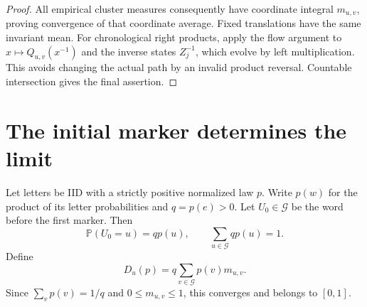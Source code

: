 \documentclass[11pt]{article}
\theoremstyle{definition}
\theoremstyle{remark}
\newcommand{\PP}{\mathbb P}
\newcommand{\Gap}{\mathcal G}
\begin{document}
\begin{proof}
All empirical cluster measures consequently have coordinate integral $m_{u,v}$, proving convergence of that coordinate average. Fixed translations have the same invariant mean. For chronological right products, apply the flow argument to $x\mapsto Q_{u,v}(x^{-1})$ and the inverse states $Z_j^{-1}$, which evolve by left multiplication. This avoids changing the actual path by an invalid product reversal. Countable intersection gives the final assertion.
\end{proof}

\section{The initial marker determines the limit}\label{sec:marker}
Let letters be IID with a strictly positive normalized law $p$. Write $p(w)$ for the product of its letter probabilities and $q=p(e)>0$. Let $U_0\in\Gap$ be the word before the first marker. Then
\begin{equation}\label{eq:gapweight}
 \PP(U_0=u)=q p(u),\qquad
 \sum_{u\in\Gap}q p(u)=1.
\end{equation}
Define
\begin{equation}\label{eq:branch}
 D_u(p)=q\sum_{v\in\Gap}p(v)m_{u,v}.
\end{equation}
Since $\sum_vp(v)=1/q$ and $0\leq m_{u,v}\leq1$, this converges and belongs to $[0,1]$.
\end{document}
